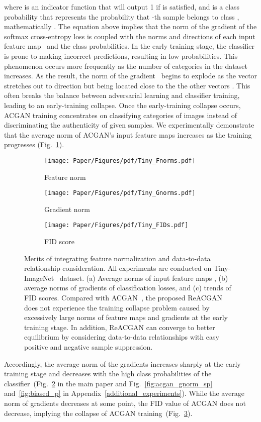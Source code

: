 \documentclass{article}
\begin{document}
where  is an indicator function that will output 1 if  is satisfied, and  is a class probability that represents the probability that -th sample belongs to class , mathematically .
The equation above implies that the norm of the gradient of the softmax cross-entropy loss is coupled with the norms and directions of each input feature map~ and the class probabilities. In the early training stage, the classifier is prone to making incorrect predictions, resulting in low probabilities. This phenomenon occurs more frequently as the number of categories in the dataset increases. As the result, the norm of the gradient~ begins to explode as the vector  stretches out to  direction but being located close to the the other vectors . This often breaks the balance between adversarial learning and classifier training, leading to an early-training collapse. Once the early-training collapse occurs, ACGAN training concentrates on classifying categories of images instead of discriminating the authenticity of given samples. We experimentally demonstrate that the average norm of ACGAN's input feature maps increases as the training progresses (Fig.~\ref{fig:acgan_fnorm}).
\begin{figure}[t]
    \centering
    \begin{subfigure}{0.32\textwidth}
    \texttt{[image: Paper/Figures/pdf/Tiny\_Fnorms.pdf]}
    \caption{Feature norm} \label{fig:acgan_fnorm}
    \end{subfigure}
    \begin{subfigure}{0.32\textwidth}
    \texttt{[image: Paper/Figures/pdf/Tiny\_Gnorms.pdf]}
    \caption{Gradient norm} \label{fig:acgan_gnorm}
    \end{subfigure}
    \begin{subfigure}{0.32\textwidth}
    \texttt{[image: Paper/Figures/pdf/Tiny\_FIDs.pdf]}
    \caption{FID score} \label{fig:acgan_fid}
    \end{subfigure}
    \caption{Merits of integrating feature normalization and data-to-data relationship consideration. All experiments are conducted on Tiny-ImageNet~\cite{Tiny} dataset. (a) Average norms of input feature maps , (b) average norms of gradients of classification losses, and (c) trends of FID scores. Compared with ACGAN~\cite{Odena2017ConditionalIS}, the proposed ReACGAN does not experience the training collapse problem caused by excessively large norms of feature maps and gradients at the early training stage. In addition, ReACGAN can converge to better equilibrium by considering data-to-data relationships with easy positive and negative sample suppression.}
    \label{fig:Figure_exploding}
\end{figure} Accordingly, the average norm of the gradients increases sharply at the early training stage and decreases with the high class probabilities of the classifier~(Fig.~\ref{fig:acgan_gnorm} in the main paper and Fig.~\ref{fig:acgan_gnorm_sp} and~\ref{fig:biased_p} in Appendix~\ref{additional_experiments}). While the average norm of gradients decreases at some point, the FID value of ACGAN does not decrease, implying the collapse of ACGAN training~(Fig.~\ref{fig:acgan_fid}).
\end{document}
